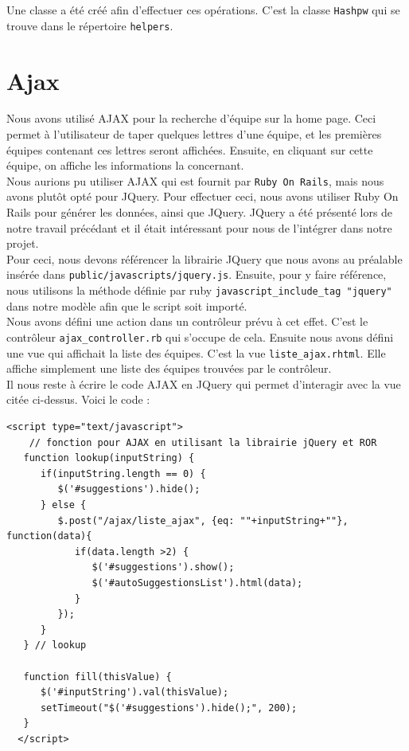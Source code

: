 \documentclass[10pt,a4paper,titlepage]{article}
\begin{document}
Une classe a été créé afin d'effectuer ces opérations. C'est la classe \verb!Hashpw! qui se trouve dans le répertoire \verb!helpers!.

\section{Ajax}

Nous avons utilisé AJAX pour la recherche d'équipe sur la home page. Ceci permet à l'utilisateur de taper quelques lettres d'une équipe, et les premières équipes contenant ces lettres seront affichées. Ensuite, en cliquant sur cette équipe, on affiche les informations la concernant. \\

Nous aurions pu utiliser AJAX qui est fournit par \texttt{Ruby On Rails}, mais nous avons plutôt opté pour JQuery. Pour effectuer ceci, nous avons utiliser Ruby On Rails pour générer les données, ainsi que JQuery. JQuery a été présenté lors de notre travail précédant et il était intéressant pour nous de l'intégrer dans notre projet. \\

Pour ceci, nous devons référencer la librairie JQuery que nous avons au préalable insérée dans \texttt{public/javascripts/jquery.js}. Ensuite, pour y faire référence, nous utilisons la méthode définie par ruby \texttt{javascript\_include\_tag "jquery"} dans notre modèle afin que le script soit importé. \\

Nous avons défini une action dans un contrôleur prévu à cet effet. C'est le contrôleur \texttt{ajax\_controller.rb} qui s'occupe de cela. Ensuite nous avons défini une vue qui affichait la liste des équipes. C'est la vue \texttt{liste\_ajax.rhtml}. Elle affiche simplement une liste des équipes trouvées par le contrôleur. \\

Il nous reste à écrire le code AJAX en JQuery qui permet d'interagir avec la vue citée ci-dessus. Voici le code :

\begin{lstlisting}
<script type="text/javascript">
  	// fonction pour AJAX en utilisant la librairie jQuery et ROR
   function lookup(inputString) {
      if(inputString.length == 0) {
         $('#suggestions').hide();
      } else {
         $.post("/ajax/liste_ajax", {eq: ""+inputString+""}, function(data){
            if(data.length >2) {
               $('#suggestions').show();
               $('#autoSuggestionsList').html(data);
            }
         });
      }
   } // lookup
   
   function fill(thisValue) {
      $('#inputString').val(thisValue);
      setTimeout("$('#suggestions').hide();", 200);
   }
  </script>
\end{lstlisting}
\end{document}
